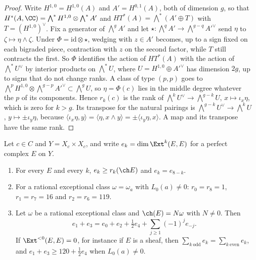\begin{proof}
Write $H^{1,0}=H^{1,0}(A)$ and $A'=H^{0,1}(A)$, both of dimension $g$, so
that $H^{*}(A,\CC)=\bigwedge^{*}H^{1,0}\otimes\bigwedge^{*}A'$ and
$HT^{*}(A)=\bigwedge^{*}(A'\oplus T)$ with $T=(H^{1,0})^{\vee}$. Fix a
generator of $\bigwedge^{g}A'$ and let
$\star\colon\bigwedge^{q}A'\to\bigwedge^{g-q}A'^{\vee}$ send $\eta$ to
$\zeta\mapsto\eta\wedge\zeta$. Under $\Phi=\mathrm{id}\otimes\star$, wedging
with $z\in A'$ becomes, up to a sign fixed on each bigraded piece, contraction
with $z$ on the second factor, while $T$ still contracts the first. So $\Phi$
identifies the action of $HT^{*}(A)$ with the action of
$\bigwedge^{*}U^{\vee}$ by interior products on $\bigwedge^{*}U$, where
$U=H^{1,0}\oplus A'^{\vee}$ has dimension $2g$, up to signs that do not change
ranks. A class of type $(p,p)$ goes to
$\bigwedge^{p}H^{1,0}\otimes\bigwedge^{g-p}A'^{\vee}\subset\bigwedge^{g}U$,
so $\eta=\Phi(c)$ lies in the middle degree whatever the $p$ of its
components. Hence $r_{k}(c)$ is the rank of
$\bigwedge^{k}U^{\vee}\to\bigwedge^{g-k}U$, $x\mapsto\iota_{x}\eta$, which is
zero for $k>g$. Its transpose for the natural pairings is
$\bigwedge^{g-k}U^{\vee}\to\bigwedge^{k}U$, $y\mapsto\pm\iota_{y}\eta$,
because $\langle\iota_{x}\eta,y\rangle=\langle\eta,x\wedge y\rangle
=\pm\langle\iota_{y}\eta,x\rangle$. A map and its transpose have the same
rank.
\end{proof}

\begin{theorem}\label{thm:mumfordprofile}
Let $c\in C$ and $Y=X_{c}\times X_{c}$, and write
$e_{k}=\dim\Ext^{k}(E,E)$ for a perfect complex $E$ on $Y$.
\begin{enumerate}[label=\textup{(\roman*)},leftmargin=2.6em,itemsep=2pt]
\item For every $E$ and every $k$, $e_{k}\ge r_{k}(\ch E)$ and
  $e_{k}=e_{8-k}$.
\item For a rational exceptional class $\omega=\omega_{a}$ with
  $L_{0}(a)\ne0$: $r_{0}=r_{8}=1$, $r_{1}=r_{7}=16$ and $r_{2}=r_{6}=119$.
\item Let $\omega$ be a rational exceptional class and $\ch(E)=N\omega$
  with $N\ne0$. Then
  \[
    e_{1}+e_{3}=e_{0}+e_{2}+\tfrac12e_{4}
      +\sum_{j\ge1}(-1)^{j}e_{-j}.
  \]
  If $\Ext^{<0}(E,E)=0$, for instance if $E$ is a sheaf, then
  $\sum_{k\ \mathrm{odd}}e_{k}=\sum_{k\ \mathrm{even}}e_{k}$, and
  $e_{1}+e_{3}\ge120+\frac12e_{4}$ when $L_{0}(a)\ne0$.
\end{enumerate}
\end{theorem}

